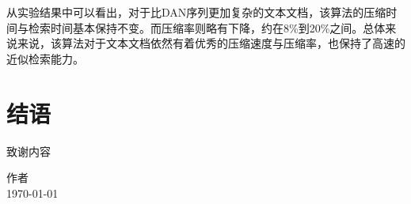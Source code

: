 ﻿\documentclass{sysuthesis}
\begin{document}
从实验结果中可以看出，对于比DAN序列更加复杂的文本文档，该算法的压缩时间与检索时间基本保持不变。而压缩率则略有下降，约在8\%到20\%之间。总体来说来说，该算法对于文本文档依然有着优秀的压缩速度与压缩率，也保持了高速的近似检索能力。



\chapter{结语}



\songti



\appendix

\begin{thankto}

	\songti{}
	致谢内容

	\vskip 18pt
	\begin{flushright}
		作者\\
		\today
	\end{flushright}
\end{thankto}

\backmatter
\end{document}
